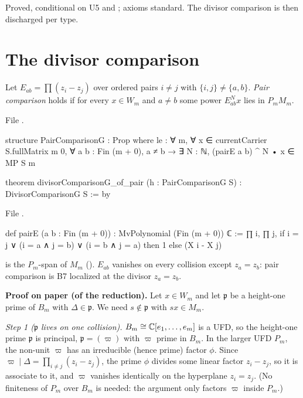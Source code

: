 \begin{status}
Proved, conditional on U5 and ; axioms standard. The divisor comparison is then
discharged per type.
\end{status}

\section{The divisor comparison}\label{l24:sec:divisor}

\begin{definition}\label{l24:def:pair}
Let $E_{ab}=\prod(z_i-z_j)$ over ordered pairs $i\neq j$ with $\{i,j\}\neq\{a,b\}$. \emph{Pair comparison} holds if for
every $x\in W_m$ and $a\neq b$ some power $E_{ab}^N x$ lies in $P_mM_m$.
\end{definition}
\noindent File .
\begin{leancode}
structure PairComparisonG : Prop where
  le : ∀ m, ∀ x ∈ currentCarrier S.fullMatrix m 0, ∀ a b : Fin (m + 0), a ≠ b →
    ∃ N : ℕ, (pairE a b) ^ N • x ∈ MP S m

theorem divisorComparisonG_of_pair (h : PairComparisonG S) : DivisorComparisonG S := by
\end{leancode}
\noindent File .
\begin{leancode}
def pairE (a b : Fin (m + 0)) : MvPolynomial (Fin (m + 0)) ℂ :=
  ∏ i, ∏ j, if i = j ∨ (i = a ∧ j = b) ∨ (i = b ∧ j = a) then 1 else (X i - X j)
\end{leancode}

\begin{dictionary}
 is the $P_m$-span of $M_m$ (). $E_{ab}$ vanishes on every
collision except $z_a=z_b$: pair comparison is B7 localized at the divisor $z_a=z_b$.
\end{dictionary}

\textbf{Proof on paper (of the reduction).} Let $x\in W_m$ and let $\mathfrak p$ be a height-one prime of $B_m$ with
$\Delta\in\mathfrak p$. We need $s\notin\mathfrak p$ with $sx\in M_m$.

\emph{Step 1 ($\mathfrak p$ lives on one collision).} $B_m\cong{\mathbb{C}}[e_1,\dots,e_m]$ is a UFD, so the height-one prime $\mathfrak p$ is
principal, $\mathfrak p=(\varpi)$ with $\varpi$ prime in $B_m$. In the larger UFD $P_m$, the non-unit $\varpi$ has an irreducible
(hence prime) factor $\phi$. Since $\varpi\mid\Delta=\prod_{i\neq j}(z_i-z_j)$, the prime $\phi$ divides some linear factor
$z_i-z_j$, so it is associate to it, and $\varpi$ vanishes identically on the hyperplane $z_i=z_j$. (No finiteness of $P_m$
over $B_m$ is needed: the argument only factors $\varpi$ inside $P_m$.)

